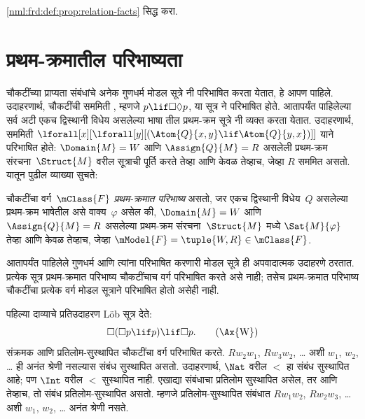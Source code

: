 \begin{prob}
  \ref{nml:frd:def:prop:relation-facts} सिद्ध करा.
\end{prob}












\section{प्रथम-क्रमातील परिभाष्यता}\label{nml:frd:fol:sec}

चौकटींच्या प्राप्यता संबंधांचे अनेक गुणधर्म मोडल
सूत्रे नी परिभाषित करता येतात, हे आपण पाहिले.
उदाहरणार्थ, चौकटींची सममिती , म्हणजे
$p \lif \Box\Diamond
p$, या सूत्र ने परिभाषित होते. आतापर्यंत
पाहिलेल्या सर्व अटी एकच द्विस्थानी विधेय
असलेल्या भाषा तील प्रथम-क्रम सूत्रे
नी व्यक्त करता येतात. उदाहरणार्थ, सममिती
$\lforall[x][\lforall[y][(\Atom{Q}{x,y} \lif \Atom{Q}{y, x})]]$
याने परिभाषित होते: $\Domain{M} =
W$ आणि $\Assign{Q}{M} = R$ असलेली प्रथम-क्रम
संरचना~$\Struct{M}$ वरील सूत्राची पूर्ति करते
तेव्हा आणि केवळ तेव्हाच, जेव्हा $R$ सममित असतो.
यातून पुढील व्याख्या सुचते:

\begin{defn}
  चौकटींचा वर्ग~$\mClass{F}$ \emph{प्रथम-क्रमात
  परिभाष्य} असतो, जर एकच द्विस्थानी विधेय~$Q$
  असलेल्या प्रथम-क्रम भाषेतील असे वाक्य~$\varphi$
  असेल की, $\Domain{M} = W$ आणि $\Assign{Q}{M}
  = R$ असलेल्या प्रथम-क्रम संरचना~$\Struct{M}$
  मध्ये $\Sat{M}{\varphi}$ तेव्हा आणि केवळ तेव्हाच,
  जेव्हा $\mModel{F} =
  \tuple{W, R} \in \mClass{F}$.
\end{defn}

आतापर्यंत पाहिलेले गुणधर्म आणि त्यांना परिभाषित करणारी
मोडल सूत्रे ही अपवादात्मक उदाहरणे ठरतात.
प्रत्येक सूत्र प्रथम-क्रमात परिभाष्य चौकटींचाच
वर्ग परिभाषित करते असे नाही; तसेच प्रथम-क्रमात
परिभाष्य चौकटींचा प्रत्येक वर्ग मोडल सूत्राने
परिभाषित होतो असेही नाही.

पहिल्या दाव्याचे प्रतिउदाहरण L\"ob सूत्र देते:
\begin{equation}
\Box(\Box p \lif p) \lif \Box p. \tag{\Ax{W}}
\end{equation}
 संक्रमक आणि प्रतिलोम-सुस्थापित चौकटींचा वर्ग
परिभाषित करते. $Rw_2w_1$, $Rw_3w_2$, \dots{}
अशी $w_1$, $w_2$, \dots{} ही अनंत श्रेणी नसल्यास
संबंध सुस्थापित असतो. उदाहरणार्थ, $\Nat$ वरील
$<$ हा संबंध सुस्थापित आहे; पण $\Int$ वरील
$<$ सुस्थापित नाही. एखाद्या संबंधाचा प्रतिलोम
सुस्थापित असेल, तर आणि तेव्हाच, तो संबंध प्रतिलोम-सुस्थापित
असतो. म्हणजे प्रतिलोम-सुस्थापित संबंधात $Rw_1w_2$,
$Rw_2w_3$, \dots{} अशी $w_1$, $w_2$, \dots{}
अनंत श्रेणी नसते.

